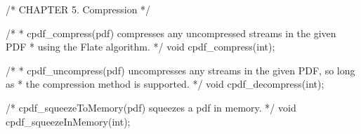 /* CHAPTER 5. Compression */

/*
 * cpdf_compress(pdf) compresses any uncompressed streams in the given PDF
 * using the Flate algorithm.
 */
void cpdf_compress(int);

/*
 * cpdf_uncompress(pdf) uncompresses any streams in the given PDF, so long as
 * the compression method is supported.
 */
void cpdf_decompress(int);

/* cpdf_squeezeToMemory(pdf) squeezes a pdf in memory. */
void cpdf_squeezeInMemory(int);

